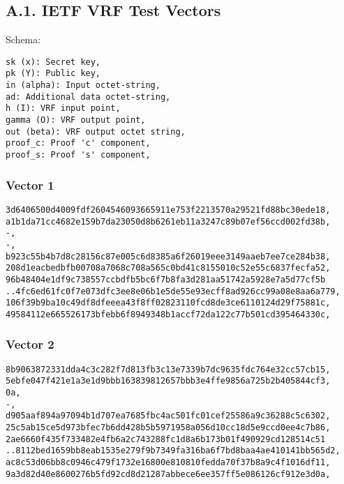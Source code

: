 \documentclass[
]{article}
\begin{document}
\hypertarget{a.1.-ietf-vrf-test-vectors}{%
\subsection{A.1. IETF VRF Test
Vectors}\label{a.1.-ietf-vrf-test-vectors}}

Schema:

\begin{verbatim}
sk (x): Secret key,
pk (Y): Public key,
in (alpha): Input octet-string,
ad: Additional data octet-string,
h (I): VRF input point,
gamma (O): VRF output point,
out (beta): VRF output octet string,
proof_c: Proof 'c' component,
proof_s: Proof 's' component,
\end{verbatim}

\hypertarget{vector-1}{%
\subsubsection{Vector 1}\label{vector-1}}

\begin{verbatim}
3d6406500d4009fdf2604546093665911e753f2213570a29521fd88bc30ede18,
a1b1da71cc4682e159b7da23050d8b6261eb11a3247c89b07ef56ccd002fd38b,
-,
-,
b923c55b4b7d8c28156c87e005c6d8385a6f26019eee3149aaeb7ee7ce284b38,
208d1eacbedbfb00708a7068c708a565c0bd41c8155010c52e55c6837fecfa52,
96b48404e1df9c738557ccbdfb5bc6f7b8fa3d281aa51742a5928e7a5d77cf5b
..4fc6ed61fc0f7e073dfc3ee8e06b1e5de55e93ecff8ad926cc99a08e8aa6a779,
106f39b9ba10c49df8dfeeea43f8ff02823110fcd8de3ce6110124d29f75881c,
49584112e665526173bfebb6f8949348b1accf72da122c77b501cd395464330c,
\end{verbatim}

\hypertarget{vector-2}{%
\subsubsection{Vector 2}\label{vector-2}}

\begin{verbatim}
8b9063872331dda4c3c282f7d813fb3c13e7339b7dc9635fdc764e32cc57cb15,
5ebfe047f421e1a3e1d9bbb163839812657bbb3e4ffe9856a725b2b405844cf3,
0a,
-,
d905aaf894a97094b1d707ea7685fbc4ac501fc01cef25586a9c36288c5c6302,
25c5ab15ce5d973bfec7b6dd428b5b5971958a056d10cc18d5e9ccd0ee4c7b86,
2ae6660f435f733482e4fb6a2c743288fc1d8a6b173b01f490929cd128514c51
..8112bed1659bb8eab1535e279f9b7349fa316ba6f7bd8baa4ae410141bb565d2,
ac8c53d06bb8c0946c479f1732e16800e810810fedda70f37b8a9c4f1016df11,
9a3d82d40e8600276b5fd92cd8d21287abbece6ee357ff5e086126cf912e3d0a,
\end{verbatim}
\end{document}
